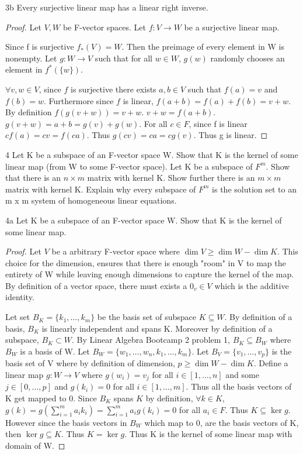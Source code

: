 \documentclass{article}
\newcommand{\rarr}[0]{\rightarrow}
\begin{document}
\begin{claim}{3b}
	Every surjective linear map has a linear right inverse.
\end{claim}
\begin{proof}
	Let $V, W$ be F-vector spaces. Let $f: V \rarr W$ be a surjective linear map.

	Since f is surjective $f_*(V) = W$. Then the preimage of every element in W is nonempty. Let $g: W \rarr V$ such that for all $w \in W$, $g(w)$ randomly chooses an element in $f^*(\{w\})$.

	$\forall v, w \in V$, since $f$ is surjective there exists $a, b \in V$ such that $f(a) = v$ and $f(b) = w$. Furthermore since $f$ is linear, $f(a + b) = f(a) + f(b) = v + w$. By definition $f(g(v + w)) = v + w$. $v + w = f(a + b)$. $g(v + w) = a + b = g(v) + g(w)$. For all $c \in F$, since f is linear $cf(a)= cv =f(ca)$. Thus $g(cv) = ca = cg(v)$. Thus g is linear. 
\end{proof}
\begin{PROB}{4}\label{Problem 4.}
	Let K be a subspace of an F-vector space W. Show that K is the kernel of some linear map (from W to some F-vector space).
	Let K be a subspace of $F^m$. Show that there is an $n \times m$ matrix with kernel K. Show further there is an $m \times m$ matrix with kernel K.  Explain why every subspace of $F^m$ is the solution set to an m x m system of homogeneous linear equations.
\end{PROB}
\begin{claim}{4a}
	Let K be a subspace of an F-vector space W. Show that K is the kernel of some linear map.
\end{claim}
\begin{proof}
	Let $V$ be a arbitrary F-vector space where $\dim V \geq \dim W - \dim K$. This choice for the dimension, ensures that there is enough "room" in V to map the entirety of W while leaving enough dimensions to capture the kernel of the map. By definition of a vector space, there must exists a $0_v \in V$ which is the additive identity.

	Let set $B_K = \{k_1, \ldots, k_m\}$ be the basis set of subspace $K \subseteq W$. By definition of a basis, $B_K$ is linearly independent and spans K. Moreover by definition of a subspace, $B_K \subset W$. By Linear Algebra Bootcamp 2 problem 1, $B_K \subseteq B_W$ where $B_W$ is a basis of W. Let $B_W = \{w_1, \ldots, w_n, k_1, \ldots, k_m \}$. Let $B_V = \{v_1, \ldots, v_p\}$ is the basis set of V where by definition of dimension, $p \geq \dim W - \dim K$. Define a linear map $g: W \rarr V$ where $g(w_i) = v_j$ for all $i \in [1, \ldots, n]$ and some $j \in [0, \ldots, p]$ and $g(k_i) = 0$ for all $i \in [1, \ldots, m]$. Thus all the basis vectors of K get mapped to 0. Since $B_K$ spans $K$ by definition, $\forall k \in K$, $g(k) = g(\sum_{i=1}^{m}a_ik_i) = \sum_{i=1}^{m}a_ig(k_i) = 0$ for all $a_i \in F$. Thus $K \subseteq \ker g$. However since the basis vectors in $B_W$ which map to 0, are the basis vectors of K, then $\ker g \subseteq K$. Thus $K = \ker g$. Thus K is the kernel of some linear map with domain of W.
\end{proof}
\end{document}
